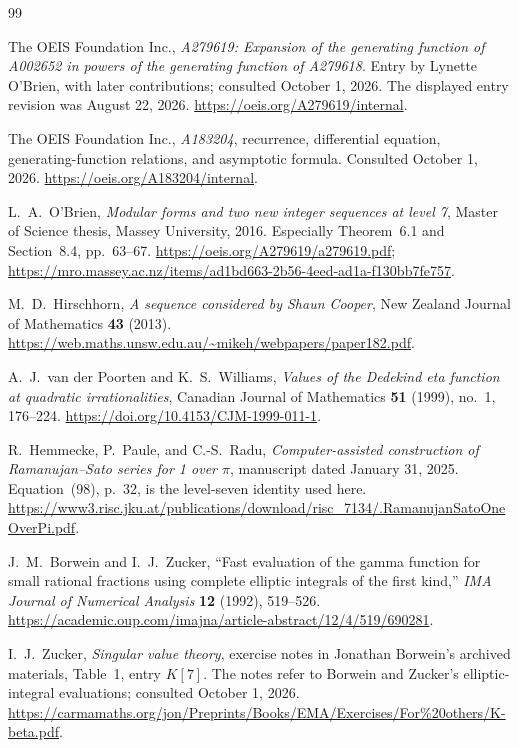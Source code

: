 \documentclass[11pt,letterpaper]{article}
\theoremstyle{remark}\newtheorem{remark}[theorem]{Remark}
\newcounter{l7gtrsavedeq}
\begin{document}
\clearpage
\begin{thebibliography}{99}
\raggedright

The OEIS Foundation Inc., \emph{A279619: Expansion of the generating
function of A002652 in powers of the generating function of A279618}.
Entry by Lynette O'Brien, with later contributions; consulted October 1,
2026. The displayed entry revision was August 22, 2026.
\url{https://oeis.org/A279619/internal}.

The OEIS Foundation Inc., \emph{A183204}, recurrence, differential
equation, generating-function relations, and asymptotic formula.
Consulted October 1, 2026.
\url{https://oeis.org/A183204/internal}.

L.~A.~O'Brien, \emph{Modular forms and two new integer sequences at level 7},
Master of Science thesis, Massey University, 2016.
Especially Theorem~6.1 and Section~8.4, pp.~63--67.
\url{https://oeis.org/A279619/a279619.pdf};
\url{https://mro.massey.ac.nz/items/ad1bd663-2b56-4eed-ad1a-f130bb7fe757}.

M.~D.~Hirschhorn,
\emph{A sequence considered by Shaun Cooper},
New Zealand Journal of Mathematics \textbf{43} (2013).
\url{https://web.maths.unsw.edu.au/~mikeh/webpapers/paper182.pdf}.

A.~J.~van der Poorten and K.~S.~Williams,
\emph{Values of the Dedekind eta function at quadratic irrationalities},
Canadian Journal of Mathematics \textbf{51} (1999), no.~1, 176--224.
\url{https://doi.org/10.4153/CJM-1999-011-1}.

R.~Hemmecke, P.~Paule, and C.-S.~Radu,
\emph{Computer-assisted construction of Ramanujan--Sato series for
1 over $\pi$}, manuscript dated January 31, 2025.
Equation~(98), p.~32, is the level-seven identity used here.
\url{https://www3.risc.jku.at/publications/download/risc_7134/.RamanujanSatoOneOverPi.pdf}.

J.~M.~Borwein and I.~J.~Zucker,
``Fast evaluation of the gamma function for small rational fractions
using complete elliptic integrals of the first kind,''
\emph{IMA Journal of Numerical Analysis} \textbf{12} (1992), 519--526.
\url{https://academic.oup.com/imajna/article-abstract/12/4/519/690281}.

I.~J.~Zucker, \emph{Singular value theory}, exercise notes in
Jonathan Borwein's archived materials, Table~1, entry $K[7]$.
The notes refer to Borwein and Zucker's elliptic-integral evaluations;
consulted October 1, 2026.
\url{https://carmamaths.org/jon/Preprints/Books/EMA/Exercises/For%20others/K-beta.pdf}.


\end{thebibliography}
\end{document}
